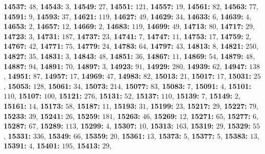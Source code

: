 \textsf{\bfseries 14537:} $48$, \textsf{\bfseries 14543:} $3$, \textsf{\bfseries 14549:} $27$, \textsf{\bfseries 14551:} $121$, \textsf{\bfseries 14557:} $19$, \textsf{\bfseries 14561:} $82$, \textsf{\bfseries 14563:} $77$, \textsf{\bfseries 14591:} $9$, \textsf{\bfseries 14593:} $37$, \textsf{\bfseries 14621:} $119$, \textsf{\bfseries 14627:} $49$, \textsf{\bfseries 14629:} $34$, \textsf{\bfseries 14633:} $6$, \textsf{\bfseries 14639:} $4$, \textsf{\bfseries 14653:} $2$, \textsf{\bfseries 14657:} $12$, \textsf{\bfseries 14669:} $2$, \textsf{\bfseries 14683:} $119$, \textsf{\bfseries 14699:} $49$, \textsf{\bfseries 14713:} $80$, \textsf{\bfseries 14717:} $29$, \textsf{\bfseries 14723:} $3$, \textsf{\bfseries 14731:} $187$, \textsf{\bfseries 14737:} $23$, \textsf{\bfseries 14741:} $7$, \textsf{\bfseries 14747:} $11$, \textsf{\bfseries 14753:} $17$, \textsf{\bfseries 14759:} $2$, \textsf{\bfseries 14767:} $42$, \textsf{\bfseries 14771:} $75$, \textsf{\bfseries 14779:} $24$, \textsf{\bfseries 14783:} $64$, \textsf{\bfseries 14797:} $43$, \textsf{\bfseries 14813:} $8$, \textsf{\bfseries 14821:} $250$, \textsf{\bfseries 14827:} $35$, \textsf{\bfseries 14831:} $3$, \textsf{\bfseries 14843:} $48$, \textsf{\bfseries 14851:} $36$, \textsf{\bfseries 14867:} $11$, \textsf{\bfseries 14869:} $54$, \textsf{\bfseries 14879:} $48$, \textsf{\bfseries 14887:} $94$, \textsf{\bfseries 14891:} $70$, \textsf{\bfseries 14897:} $3$, \textsf{\bfseries 14923:} $91$, \textsf{\bfseries 14929:} $280$, \textsf{\bfseries 14939:} $62$, \textsf{\bfseries 14947:} $138$, \textsf{\bfseries 14951:} $87$, \textsf{\bfseries 14957:} $17$, \textsf{\bfseries 14969:} $47$, \textsf{\bfseries 14983:} $82$, \textsf{\bfseries 15013:} $21$, \textsf{\bfseries 15017:} $17$, \textsf{\bfseries 15031:} $25$, \textsf{\bfseries 15053:} $128$, \textsf{\bfseries 15061:} $34$, \textsf{\bfseries 15073:} $214$, \textsf{\bfseries 15077:} $83$, \textsf{\bfseries 15083:} $7$, \textsf{\bfseries 15091:} $4$, \textsf{\bfseries 15101:} $110$, \textsf{\bfseries 15107:} $100$, \textsf{\bfseries 15121:} $276$, \textsf{\bfseries 15131:} $52$, \textsf{\bfseries 15137:} $110$, \textsf{\bfseries 15139:} $7$, \textsf{\bfseries 15149:} $2$, \textsf{\bfseries 15161:} $14$, \textsf{\bfseries 15173:} $58$, \textsf{\bfseries 15187:} $11$, \textsf{\bfseries 15193:} $31$, \textsf{\bfseries 15199:} $23$, \textsf{\bfseries 15217:} $29$, \textsf{\bfseries 15227:} $79$, \textsf{\bfseries 15233:} $39$, \textsf{\bfseries 15241:} $26$, \textsf{\bfseries 15259:} $181$, \textsf{\bfseries 15263:} $46$, \textsf{\bfseries 15269:} $12$, \textsf{\bfseries 15271:} $65$, \textsf{\bfseries 15277:} $6$, \textsf{\bfseries 15287:} $67$, \textsf{\bfseries 15289:} $113$, \textsf{\bfseries 15299:} $4$, \textsf{\bfseries 15307:} $10$, \textsf{\bfseries 15313:} $163$, \textsf{\bfseries 15319:} $29$, \textsf{\bfseries 15329:} $55$, \textsf{\bfseries 15331:} $336$, \textsf{\bfseries 15349:} $66$, \textsf{\bfseries 15359:} $20$, \textsf{\bfseries 15361:} $13$, \textsf{\bfseries 15373:} $5$, \textsf{\bfseries 15377:} $5$, \textsf{\bfseries 15383:} $13$, \textsf{\bfseries 15391:} $4$, \textsf{\bfseries 15401:} $195$, \textsf{\bfseries 15413:} $29$, 
